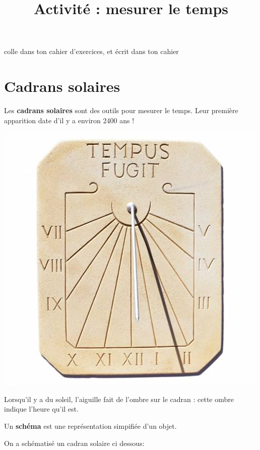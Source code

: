 \documentclass[a4paper,11pt]{article}
\title{Activité : mesurer le temps}
\date{}
\author{}
\makeatletter
\renewcommand{\maketitle}{%
{\scriptsize colle dans ton cahier d'exercices, et écrit dans ton cahier} \vspace{0.5em}

	\begin{center}
		\LARGE
		\myuline{\@title}
		\vspace{1em}
	\end{center}
}
\makeatother
\begin{document}
\maketitle

\section{Cadrans solaires}

\begin{greybox}[frametitle={Point historique}]
	Les \textbf{cadrans solaires} sont des outils pour mesurer le temps. Leur première apparition date d'il y a environ 2400 ans !
\end{greybox}

\begin{attention}[frametitle={Comment ça fonctionne ?}]
	\begin{center}
		\includegraphics[width=0.2\linewidth]{Images/cadran solaire.jpeg}
	\end{center}

	Lorsqu'il y a du soleil, l'aiguille fait de l'ombre sur le cadran : cette ombre indique l'heure qu'il est.
\end{attention}

{\small \begin{vocabulaire}[Schéma]
	Un \textbf{schéma} est une représentation simpifiée d'un objet.
\end{vocabulaire}}

On a schématisé un cadran solaire ci dessous: \vspace{1em}

\begin{center}
\end{center} \vspace{1em}
\end{document}

